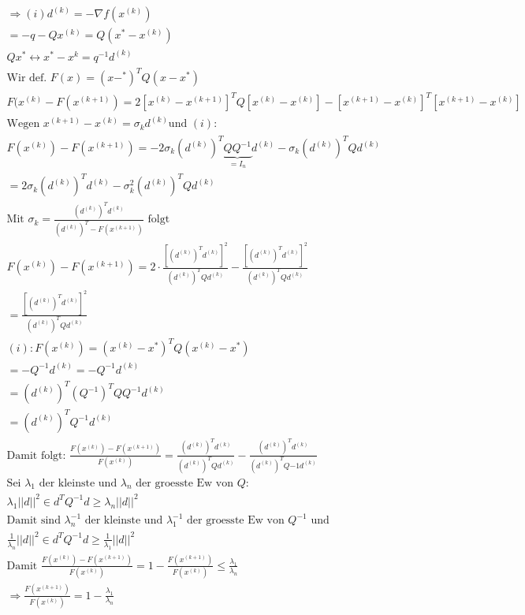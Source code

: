 \begin{equation}
     \begin{aligned}
\Rightarrow (i) d^{(k)} = - \nabla f(x^{(k)})\\
 = -q-Qx^{(k)} = Q(x^{*}-x^{(k)})\\
Qx^{*} \leftrightarrow x^{*} - x^{k} = q^{-1}d^{(k)}\\
\text{Wir def. } F(x) = (x-^{*})^TQ(x-x^{*})\\
F(x^{(k)} - F(x^{(k+1)}) = 2[x^{(k)}-x^{(k+1)}]^TQ[x^{(k)}-x^{(k)}]-[x^{(k+1)}-x^{(k)}]^T[x^{(k+1)}-x^{(k)}]\\
\text{Wegen } x^{(k+1)}-x^{(k)} =\sigma_kd^{(k)} \text{und $(i)$:}\\
F(x^{(k)})-F(x^{(k+1)}) = -2\sigma_k(d^{(k)})^T\underbrace{QQ^{-1}}_{=I_n}d^{(k)}-\sigma_k(d^{(k)})^TQd^{(k)} \\
= 2\sigma_k(d^{(k)})^Td^{(k)}-\sigma^2_k(d^{(k)})^TQd^{(k)}\\
\text{Mit }\sigma_k = \frac{(d^{(k)})^Td^{(k)}}{(d^{(k)})^T-F(x^{(k+1)})} \text{ folgt}\\
F(x^{(k)})-F(x^{(k+1)}) = 2\cdot\frac{[(d^{(k)})^Td^{(k)}]^2}{(d^{(k)})^TQd^{(k)}}-\frac{[(d^{(k)})^Td^{(k)}]^2}{(d^{(k)})^TQd^{(k)}}\\
= \frac{[(d^{(k)})^Td^{(k)}]^2}{(d^{(k)})^TQd^{(k)}}\\
(i):F(x^{(k)}) = (x^{(k)}-x^{*})^TQ(x^{(k)}-x^{*})\\
= -Q^{-1}d^{(k)} = -Q^{-1}d^{(k)}\\
= (d^{(k)})^T(Q^{-1})^TQQ^{-1}d^{(k)}\\
= (d^{(k)})^TQ^{-1}d^{(k)} \\
\text{Damit folgt: } \frac{F(x^{(k)})-F(x^{(k+1)})}{F(x^{(k)})} = \frac{(d^{(k)})^Td^{(k)}}{(d^{(k)})^TQd^{(k)}} - \frac{(d^{(k)})^Td^{(k)}}{(d^{(k)})^TQ{-1}d^{(k)}} \\
\text{Sei $\lambda_1$ der kleinste und $\lambda_n$ der groesste Ew von $Q$:}\\
\lambda_1||d||^2 \in d^TQ^{-1}d\geq \lambda_n||d||^2\\
\text{Damit sind $\lambda_n^{-1} $ der kleinste und $\lambda_1^{-1}$ der groesste Ew von $Q^{-1}$ und }\\
\frac{1}{\lambda_n} ||d||^2 \in d^TQ^{-1}d \geq \frac{1}{\lambda_1}||d||^2\\
\text{Damit } \frac{F(x^{(k)})-F(x^{(k+1)})}{F(x^{(k)})} = 1-\frac{F(x^{(k+1)})}{F(x^{(k)})}\leq \frac{\lambda_1}{\lambda_n}\\
\Rightarrow \frac{F(x^{(k+1)})}{F(x^{(k)})} =1-\frac{\lambda_1}{\lambda_n}\\

\end{aligned}
\end{equation}
